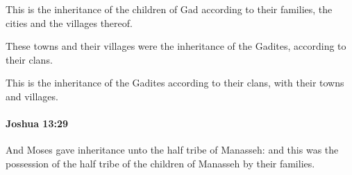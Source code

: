 			\begin{versebox}
					\item[BHS] 
					\item[ASV] This is the inheritance of the children of Gad according to their families, the cities and the villages thereof.
					\item[NIV] These towns and their villages were the inheritance of the Gadites, according to their clans.
					\item[NRSV] This is the inheritance of the Gadites according to their clans, with their towns and villages.
			\end{versebox}

		\paragraph{Joshua 13:29} %
			\label{JOSHUA-13-29}

			And Moses gave inheritance unto the half tribe of Manasseh: and this was the possession of the half tribe of the children of Manasseh by their families.

